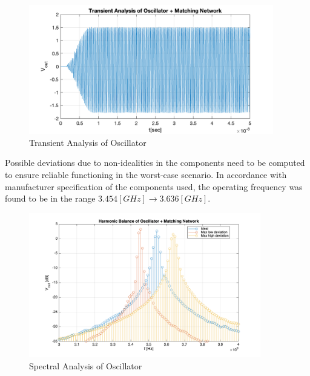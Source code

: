 \begin{figure}
    \centering
    \includegraphics[width=0.95\textwidth]{images/osc/VCO_trans.png}
    \caption{Transient Analysis of Oscillator}
    \label{fig:osc_trans}
\end{figure}

Possible deviations due to non-idealities in the components need to be computed to ensure reliable functioning in the worst-case scenario. In accordance with manufacturer specification of the components used, the operating frequency was found to be in the range \(3.454[GHz]\to 3.636[GHz]\).\par

\begin{figure}
    \centering
    \includegraphics[width=0.9\textwidth]{images/osc/VCO_spec_smoothed_with_peak_values.png}
    \caption{Spectral Analysis of Oscillator}
    \label{fig:osc_spec}
\end{figure}

